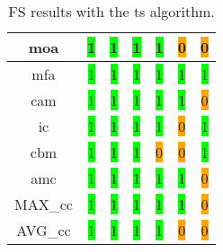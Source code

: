 \begin{table}[H]
\begin{tabular}{|c|c|c|c|c|c|c|}
        \acrshort{moa} & \colorbox{lime}{1} & \colorbox{lime}{1} & \colorbox{lime}{1} & \colorbox{lime}{1} & \colorbox{orange}{0} & \colorbox{orange}{0} \\ \hline
        \acrshort{mfa} & \colorbox{lime}{1} & \colorbox{lime}{1} & \colorbox{lime}{1} & \colorbox{lime}{1} & \colorbox{lime}{1} & \colorbox{lime}{1} \\ \hline
        \acrshort{cam} & \colorbox{lime}{1} & \colorbox{lime}{1} & \colorbox{lime}{1} & \colorbox{lime}{1} & \colorbox{lime}{1} & \colorbox{orange}{0} \\ \hline
        \acrshort{ic} & \colorbox{lime}{1} & \colorbox{lime}{1} & \colorbox{lime}{1} & \colorbox{lime}{1} & \colorbox{orange}{0} & \colorbox{lime}{1} \\ \hline
        \acrshort{cbm} & \colorbox{lime}{1} & \colorbox{lime}{1} & \colorbox{lime}{1} & \colorbox{orange}{0} & \colorbox{orange}{0} & \colorbox{lime}{1} \\ \hline
        \acrshort{amc} & \colorbox{lime}{1} & \colorbox{lime}{1} & \colorbox{lime}{1} & \colorbox{lime}{1} & \colorbox{lime}{1} & \colorbox{orange}{0} \\ \hline
        MAX\_\acrshort{cc} & \colorbox{lime}{1} & \colorbox{lime}{1} & \colorbox{lime}{1} & \colorbox{lime}{1} & \colorbox{lime}{1} & \colorbox{orange}{0} \\ \hline
        AVG\_\acrshort{cc} & \colorbox{lime}{1} & \colorbox{lime}{1} & \colorbox{lime}{1} & \colorbox{lime}{1} & \colorbox{orange}{0} & \colorbox{orange}{0} \\ \hline
    \end{tabular}
\caption{FS results with the \acrlong{ts} algorithm.}
\label{tab:ts-output}
\end{table}

